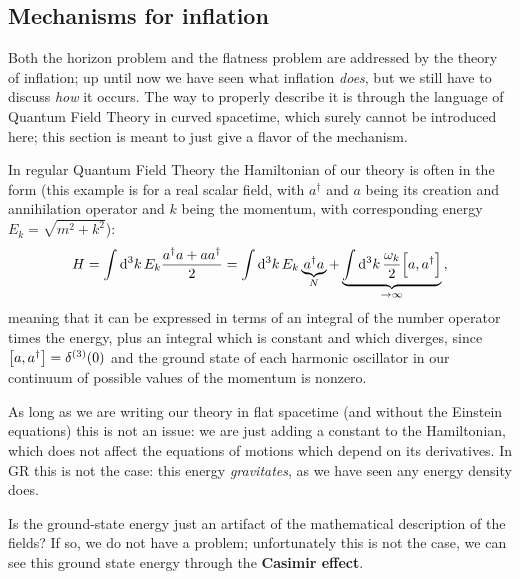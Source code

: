 \documentclass[main.tex]{subfiles}
\begin{document}
\subsection{Mechanisms for inflation}

Both the horizon problem and the flatness problem are addressed by the theory of inflation; up until now we have seen what inflation \emph{does}, but we still have to discuss \emph{how} it occurs. 
The way to properly describe it is through the language of Quantum Field Theory in curved spacetime, which surely cannot be introduced here; this section is meant to just give a flavor of the mechanism.


In regular Quantum Field Theory the Hamiltonian of our theory is often in the form (this example is for a real scalar field, with \(a ^\dag\) and \(a\) being its creation and annihilation operator and \(k\) being the momentum, with corresponding energy \(E_k = \sqrt{m^2 + k^2}\)):
%
\begin{align}
H = \int \dd[3]{k} E_k \frac{a ^\dag a + a a ^\dag}{2} = 
\int \dd[3]{k} E_k \underbrace{a ^\dag a }_{N} + \underbrace{\int \dd[3]{k} \frac{\omega_k}{2} \qty[a, a ^\dag]}_{ \to \infty }
\,,
\end{align}
%
meaning that it can be expressed in terms of an integral of the number operator times the energy, plus an integral which is constant and which diverges, since \(\qty[a, a ^\dag] = \delta^{(3)} (0)\) and the ground state of each harmonic oscillator in our continuum of possible values of the momentum is nonzero. 

As long as we are writing our theory in flat spacetime (and without the Einstein equations) this is not an issue: we are just adding a constant to the Hamiltonian, which does not affect the equations of motions which depend on its derivatives.  
In GR this is not the case: this energy \emph{gravitates}, as we have seen any energy density does. 

Is the ground-state energy just an artifact of the mathematical description of the fields? If so, we do not have a problem; unfortunately this is not the case, we can see this ground state energy through the \textbf{Casimir effect}.
\end{document}
